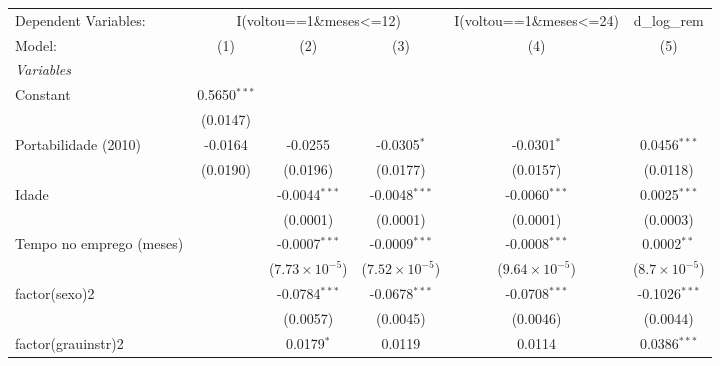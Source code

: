 
\begingroup
\centering
\begin{tabular}{lccccc}
   \tabularnewline \midrule \midrule
   Dependent Variables: & \multicolumn{3}{c}{I(voltou==1\&meses<=12)} & I(voltou==1\&meses<=24) & d\_log\_rem\\
   Model:                   & (1)                   & (2)                     & (3)                     & (4)                     & (5)\\  
   \midrule
   \emph{Variables}\\
   Constant                 & 0.5650$^{***}$        &                         &                         &                         &   \\   
                            & (0.0147)              &                         &                         &                         &   \\   
   Portabilidade (2010)     & -0.0164               & -0.0255                 & -0.0305$^{*}$           & -0.0301$^{*}$           & 0.0456$^{***}$\\   
                            & (0.0190)              & (0.0196)                & (0.0177)                & (0.0157)                & (0.0118)\\   
   Idade                    &                       & -0.0044$^{***}$         & -0.0048$^{***}$         & -0.0060$^{***}$         & 0.0025$^{***}$\\   
                            &                       & (0.0001)                & (0.0001)                & (0.0001)                & (0.0003)\\   
   Tempo no emprego (meses) &                       & -0.0007$^{***}$         & -0.0009$^{***}$         & -0.0008$^{***}$         & 0.0002$^{**}$\\   
                            &                       & ($7.73\times 10^{-5}$)  & ($7.52\times 10^{-5}$)  & ($9.64\times 10^{-5}$)  & ($8.7\times 10^{-5}$)\\    
   factor(sexo)2            &                       & -0.0784$^{***}$         & -0.0678$^{***}$         & -0.0708$^{***}$         & -0.1026$^{***}$\\   
                            &                       & (0.0057)                & (0.0045)                & (0.0046)                & (0.0044)\\   
   factor(grauinstr)2       &                       & 0.0179$^{*}$            & 0.0119                  & 0.0114                  & 0.0386$^{***}$\\   

\end{tabular}
